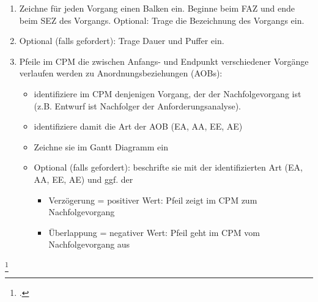 \documentclass{lehramt-informatik-haupt}
\begin{document}
\begin{enumerate}
\item Zeichne für jeden Vorgang einen Balken ein. Beginne beim FAZ und
ende beim SEZ des Vorgangs. Optional: Trage die Bezeichnung des Vorgangs
ein.

\item Optional (falls gefordert): Trage Dauer und Puffer ein.

\item Pfeile im CPM die zwischen Anfangs- und Endpunkt verschiedener
Vorgänge verlaufen werden zu Anordnungsbeziehungen (AOBs):

\begin{itemize}
\item identifiziere im CPM denjenigen Vorgang, der der Nachfolgevorgang
ist (z.B. Entwurf ist Nachfolger der Anforderungsanalyse).

\item identifiziere damit die Art der AOB (EA, AA, EE, AE)

\item Zeichne sie im Gantt Diagramm ein

\item Optional (falls gefordert): beschrifte sie mit der identifizierten
Art (EA, AA, EE, AE) und ggf. der

\begin{itemize}
\item Verzögerung = positiver Wert: Pfeil zeigt im CPM zum
Nachfolgevorgang

\item Überlappung = negativer Wert: Pfeil geht im CPM vom
Nachfolgevorgang aus
\end{itemize}
\end{itemize}
\end{enumerate}

\footcite[Seite 36]{sosy:fs:3}

\literatur
\end{document}

